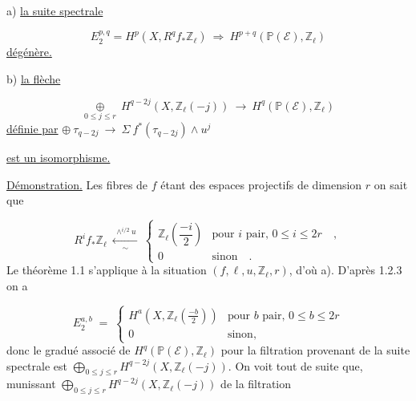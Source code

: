 a) \underline{la suite spectrale}

\begin{equation}\tag{1.2.1}
E_2^{p,q} = H^p(X,R^q f_* \mathbb{Z}_\ell) \ \Longrightarrow\ H^{p+q}(\mathbb{P}(\mathcal{E}), \mathbb{Z}_\ell)
\end{equation}
\underline{dégénère.}

b) \underline{la flèche}

\begin{equation}\tag{1.2.2}
\underset{0 \leq j \leq r}{\oplus} \ H^{q-2j}(X,\mathbb{Z}_\ell(-j)) \ \longrightarrow\ H^q(\mathbb{P}(\mathcal{E}),\mathbb{Z}_\ell)
\end{equation}
\underline{définie par} $\oplus\ \tau_{q-2j} \ \longrightarrow\ \Sigma\ f^*(\tau_{q-2j}) \wedge u^j$

\underline{est un isomorphisme.}

\underline{Démonstration.} Les fibres de $f$ étant des espaces projectifs de dimension $r$ on sait que

\begin{equation}\tag{1.2.3}
R^i f_* \mathbb{Z}_\ell \ \xleftarrow[\ \sim\ ]{\ \wedge^{i/2} u\ } \ \begin{cases} \mathbb{Z}_\ell \left( \dfrac{-i}{2} \right) & \text{pour } i \text{ pair, } 0 \leq i \leq 2r \quad , \\[2ex] 0 & \text{sinon} \quad . \end{cases}
\end{equation}
Le théorème 1.1 s'applique à la situation $(f, \ell, u, \mathbb{Z}_\ell, r)$, d'où a). D'après 1.2.3  on a 



\begin{equation}\tag{1.2.4}
 E_2^{a,b} \;=\; \begin{cases} H^a(X,\mathbb{Z}_{\ell}(\frac{-b}{2})) & \text{pour } b \text{ pair, } 0 \leq b \leq 2r \\[2ex] 0 & \text{sinon,} \end{cases}
\end{equation}
donc le gradué associé de $H^q(\mathbb{P}(\mathcal{E}), \mathbb{Z}_{\ell})$ pour la filtration provenant de la suite spectrale est $\bigoplus\limits_{0 \leq j \leq r} H^{q-2j}(X,\mathbb{Z}_{\ell}(-j))$. On voit tout de suite que, munissant $\bigoplus\limits_{0 \leq j \leq r} H^{q-2j}(X,\mathbb{Z}_{\ell}(-j))$ de la filtration

